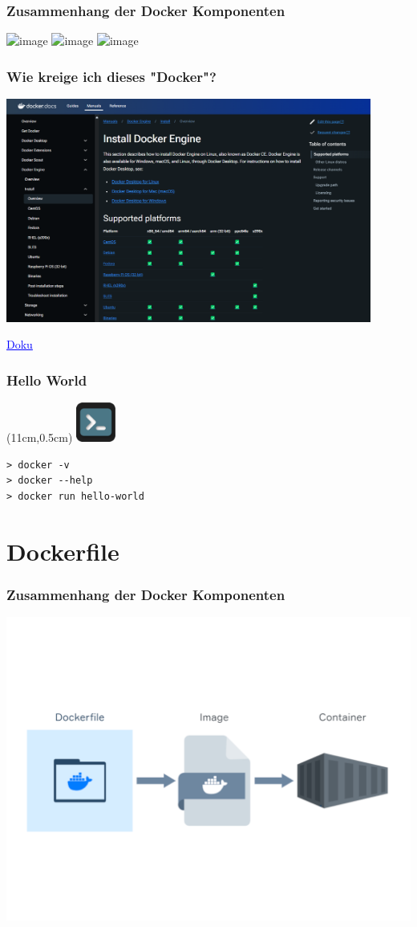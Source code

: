 \documentclass[22pt]{beamer}
\renewcommand{\href}[2]{\textcolor{blue}{\uline{#2}}}
\newcommand{\terminal}{
    \begin{textblock*}{1.3cm}(11cm,0.5cm) %
    \includegraphics[width=1.3cm]{Bilder/terminal2.png}
    \end{textblock*}
}
\begin{document}
\begin{frame}[c]
    \frametitle{Zusammenhang der Docker Komponenten}
        \includegraphics<1>[width=1\textwidth]{Bilder/Docker-Ablauf.png}
        \includegraphics<2>[width=1\textwidth]{Bilder/Commands.png}
        \includegraphics<3>[width=1\textwidth]{Bilder/Commands_Ziel.png}
\end{frame}

\begin{frame}[c]
    \frametitle{Wie kreige ich dieses "Docker"?}
    \includegraphics[width=0.9\textwidth]{Bilder/Installation.png}

    \href{https://docs.docker.com/engine/install}{Doku}
\end{frame}

\begin{frame}[fragile,t]
    \frametitle{Hello World}
    \terminal
\begin{verbatim}
> docker -v
> docker --help
> docker run hello-world
\end{verbatim}
\end{frame}

\section{Dockerfile}
\begin{frame}[c]
    \frametitle{Zusammenhang der Docker Komponenten}
    \includegraphics[width=1\textwidth]{Bilder/Docker-Ablauf_file.png}
\end{frame}
\end{document}
